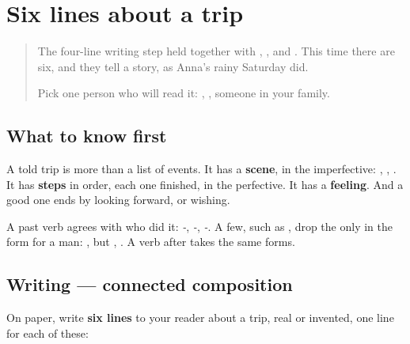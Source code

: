 \section[(six lines)]{Six lines about a trip}

\label{lesson:RU-W270-pismo}



\begin{quote}
The four-line writing step held together with \emph{}, \emph{}, \emph{} and \emph{ }. This time there are six, and they tell a story, as Anna's rainy Saturday did.

Pick one person who will read it: \emph{}, \emph{}, someone in your family.
\end{quote}

\subsection*{What to know first}
A told trip is more than a list of events. It has a \textbf{scene}, in the imperfective: \emph{}, \emph{ }, \emph{   }. It has \textbf{steps} in order, each one finished, in the perfective. It has a \textbf{feeling}. And a good one ends by looking forward, or wishing.

A past verb agrees with who did it: \emph{-}, \emph{-}, \emph{-}. A few, such as \emph{}, drop the \emph{} only in the form for a man: \emph{}, but \emph{}, \emph{}. A verb after \emph{} takes the same forms.

\subsection*{Writing — connected composition}
On paper, write \textbf{six lines} to your reader about a trip, real or invented, one line for each of these:

